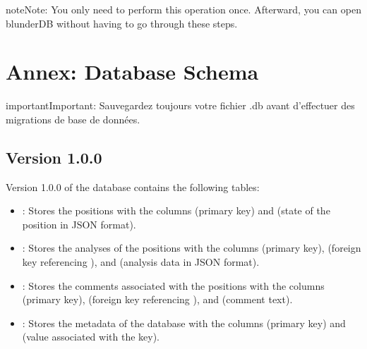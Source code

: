 \documentclass[letterpaper,10pt,english]{sphinxmanual}
\begin{document}
\begin{sphinxadmonition}{note}{Note:}
\sphinxAtStartPar
You only need to perform this operation once. Afterward, you can open blunderDB without having to go through these steps.
\end{sphinxadmonition}

\sphinxstepscope


\section{Annex: Database Schema}
\label{\detokenize{annexe_db_scheme:annexe-schema-de-la-base-de-donnees}}\label{\detokenize{annexe_db_scheme:annexe-db-migration}}\label{\detokenize{annexe_db_scheme::doc}}
\begin{sphinxadmonition}{important}{Important:}
\sphinxAtStartPar
Sauvegardez toujours votre fichier .db avant d’effectuer des migrations de base de données.
\end{sphinxadmonition}


\subsection{Version 1.0.0}
\label{\detokenize{annexe_db_scheme:version-1-0-0}}
\sphinxAtStartPar
Version 1.0.0 of the database contains the following tables:
\begin{itemize}
\item {} 
\sphinxAtStartPar
{}: Stores the positions with the columns  (primary key) and  (state of the position in JSON format).

\item {} 
\sphinxAtStartPar
{}: Stores the analyses of the positions with the columns  (primary key),  (foreign key referencing ), and  (analysis data in JSON format).

\item {} 
\sphinxAtStartPar
{}: Stores the comments associated with the positions with the columns  (primary key),  (foreign key referencing ), and  (comment text).

\item {} 
\sphinxAtStartPar
{}: Stores the metadata of the database with the columns  (primary key) and  (value associated with the key).

\end{itemize}
\end{document}
